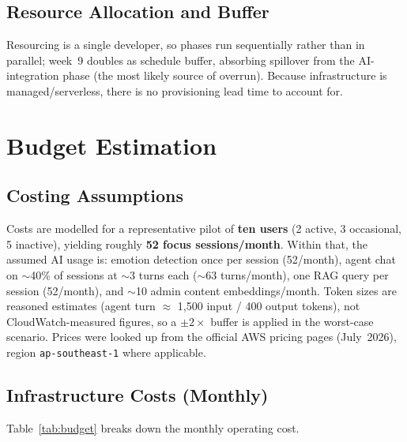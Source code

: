 \documentclass[a4paper,11pt]{article}
\begin{document}
	\subsection{Resource Allocation and Buffer}
	Resourcing is a single developer, so phases run sequentially rather than in parallel;
	week~9 doubles as schedule buffer, absorbing spillover from the AI-integration phase (the
	most likely source of overrun). Because infrastructure is managed/serverless, there is no
	provisioning lead time to account for.

	\section{Budget Estimation}

	\subsection{Costing Assumptions}
	Costs are modelled for a representative pilot of \textbf{ten users} (2 active, 3 occasional,
	5 inactive), yielding roughly \textbf{52 focus sessions/month}. Within that, the assumed AI
	usage is: emotion detection once per session (52/month), agent chat on $\sim$40\% of
	sessions at $\sim$3 turns each ($\sim$63 turns/month), one RAG query per session (52/month),
	and $\sim$10 admin content embeddings/month. Token sizes are reasoned estimates (agent turn
	$\approx$ 1{,}500 input / 400 output tokens), not CloudWatch-measured figures, so a
	$\pm 2\times$ buffer is applied in the worst-case scenario. Prices were looked up from the
	official AWS pricing pages (July~2026), region \texttt{ap-southeast-1} where applicable.

	\subsection{Infrastructure Costs (Monthly)}
	Table~\ref{tab:budget} breaks down the monthly operating cost.
\end{document}

